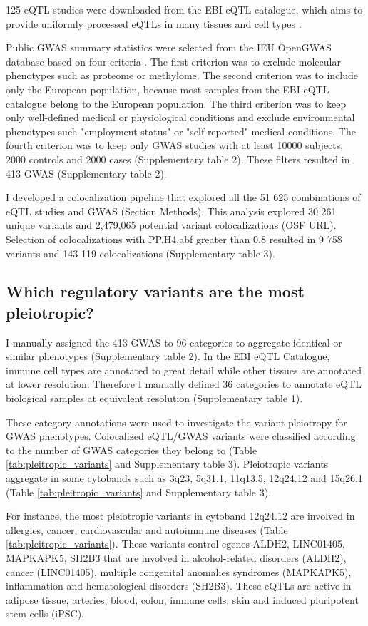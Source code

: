 125 eQTL studies were downloaded from the EBI eQTL catalogue, which aims to provide uniformly processed eQTLs in many tissues and cell types \citep{2021.Alasoo.Kerimov}.

Public GWAS summary statistics were selected from the IEU OpenGWAS database based on four criteria \citep{2018.Parkinson.Buniello}.
%
The first criterion was to exclude molecular phenotypes such as proteome or methylome.
%	
The second criterion was to include only the European population, because most samples from the EBI eQTL catalogue belong to the European population.
%
The third criterion was to keep only well-defined medical or physiological conditions and exclude environmental phenotypes such "employment status" or "self-reported" medical conditions.
%
The fourth criterion was to keep only GWAS studies with at least 10000 subjects, 2000 controls and 2000 cases (Supplementary table 2).
%
These filters resulted in 413 GWAS (Supplementary table 2).

I developed a colocalization pipeline that explored all the 51 625 combinations of eQTL studies and GWAS (Section Methods).
%
This analysis explored 30 261 unique variants and 2,479,065 potential variant colocalizations (OSF URL).
%
Selection of colocalizations with PP.H4.abf greater than 0.8 resulted in 9 758 variants and 143 119 colocalizations (Supplementary table 3).

\subsection*{Which regulatory variants are the most pleiotropic?}

I manually assigned the 413 GWAS to 96 categories to aggregate identical or similar phenotypes (Supplementary table 2).
%
In the EBI eQTL Catalogue, immune cell types are annotated to great detail while other tissues are annotated at lower resolution.
%
Therefore I manually defined 36 categories to annotate eQTL biological samples at equivalent resolution (Supplementary table 1).

These category annotations were used to investigate the variant pleiotropy for GWAS phenotypes.
%
Colocalized eQTL/GWAS variants were classified according to the number of GWAS categories they belong to (Table \ref{tab:pleitropic_variants} and Supplementary table 3).
%
Pleiotropic variants aggregate in some cytobands such as 3q23, 5q31.1, 11q13.5, 12q24.12 and 15q26.1 (Table \ref{tab:pleitropic_variants} and Supplementary table 3).

For instance, the most pleiotropic variants in cytoband 12q24.12 are involved in allergies, cancer, cardiovascular and autoimmune diseases (Table \ref{tab:pleitropic_variants}).
%
These variants control egenes ALDH2, LINC01405, MAPKAPK5, SH2B3 that are involved in alcohol-related disorders (ALDH2), cancer (LINC01405), multiple congenital anomalies syndromes (MAPKAPK5),  inflammation and hematological disorders (SH2B3).
%
These eQTLs are active in adipose tissue, arteries, blood, colon, immune cells, skin and induced pluripotent stem cells (iPSC).

